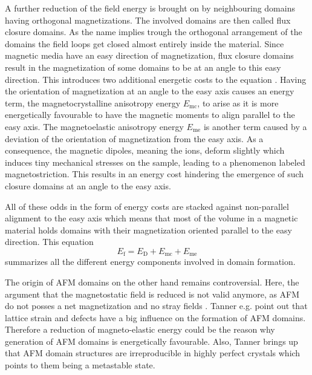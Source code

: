 A further reduction of the field energy is brought on by neighbouring domains having orthogonal magnetizations.
The involved domains are then called flux closure domains.
As the name implies trough the orthogonal arrangement of the domains the field loops get closed almost entirely inside the material.
Since magnetic media have an easy direction of magnetization, flux closure domains result in the magnetization of some domains to be at an angle to this easy direction.
This introduces two additional energetic costs to the equation .
Having the orientation of magnetization at an angle to the easy axis causes an energy term, the magnetocrystalline anisotropy energy $E_{\text{mc}}$, to arise as it is more energetically favourable to have the magnetic moments to align parallel to the easy axis.
The magnetoelastic anisotropy energy $E_{\text{me}}$ is another term caused by a deviation of the orientation of magnetization from the easy axis.
As a consequence, the magnetic dipoles, meaning the ions, deform slightly which induces tiny mechanical stresses on the sample, leading to a phenomenon labeled magnetostriction.
This results in an energy cost hindering the emergence of such closure domains at an angle to the easy axis.

All of these odds in the form of energy costs are stacked against non-parallel alignment to the easy axis which means that most of the volume in a magnetic material holds domains with their magnetization oriented parallel to the easy direction.
This equation
\begin{equation}
    E_{\text{f}} = E_{\text{D}} + E_{\text{mc}} + E_{\text{me}}
    \label{eqn:landau_lifschitz_energy}
\end{equation}
summarizes all the different energy components involved in domain formation.

The origin of AFM domains on the other hand remains controversial.
Here, the argument that the magnetostatic field is reduced is not valid anymore, as AFM do not posses a net magnetization and no stray fields .
Tanner e.g. point out that lattice strain and defects have a big influence on the formation of AFM domains.
Therefore a reduction of magneto-elastic energy could be the reason why generation of AFM domains is energetically favourable.
Also, Tanner brings up that AFM domain structures are irreproducible in highly perfect crystals which points to them being a metastable state.


